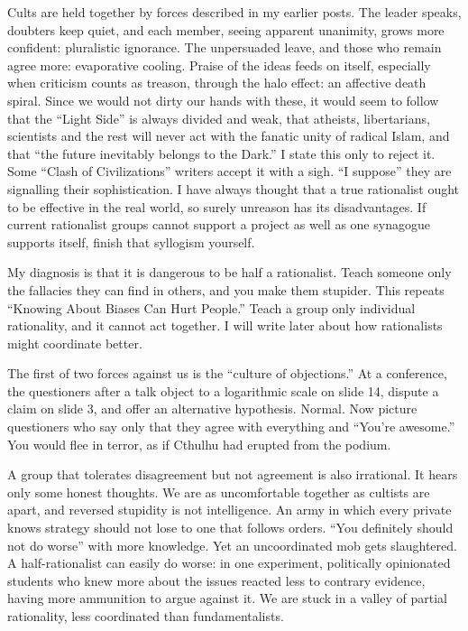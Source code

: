 Cults are held together by forces described in my earlier posts. The leader speaks, doubters keep quiet, and each member, seeing apparent unanimity, grows more confident: pluralistic ignorance. The unpersuaded leave, and those who remain agree more: evaporative cooling. Praise of the ideas feeds on itself, especially when criticism counts as treason, through the halo effect: an affective death spiral. Since we would not dirty our hands with these, it would seem to follow that the ``Light Side'' is always divided and weak, that atheists, libertarians, scientists and the rest will never act with the fanatic unity of radical Islam, and that ``the future inevitably belongs to the Dark.'' I state this only to reject it. Some ``Clash of Civilizations'' writers accept it with a sigh. ``I suppose'' they are signalling their sophistication.  I have always thought that a true rationalist ought to be effective in the real world, so surely unreason has its disadvantages. If current rationalist groups cannot support a project as well as one synagogue supports itself, finish that syllogism yourself.

My diagnosis is that it is dangerous to be half a rationalist. Teach someone only the fallacies they can find in others, and you make them stupider. This repeats ``Knowing About Biases Can Hurt People.'' Teach a group only individual rationality, and it cannot act together. I will write later about how rationalists might coordinate better.

The first of two forces against us is the ``culture of objections.'' At a conference, the questioners after a talk object to a logarithmic scale on slide 14, dispute a claim on slide 3, and offer an alternative hypothesis. Normal. Now picture questioners who say only that they agree with everything and ``You're awesome.'' You would flee in terror, as if Cthulhu had erupted from the podium.

A group that tolerates disagreement but not agreement is also irrational. It hears only some honest thoughts. We are as uncomfortable together as cultists are apart, and reversed stupidity is not intelligence. An army in which every private knows strategy should not lose to one that follows orders. ``You definitely should not do worse'' with more knowledge. Yet an uncoordinated mob gets slaughtered. A half-rationalist can easily do worse: in one experiment, politically opinionated students who knew more about the issues reacted less to contrary evidence, having more ammunition to argue against it. We are stuck in a valley of partial rationality, less coordinated than fundamentalists.

